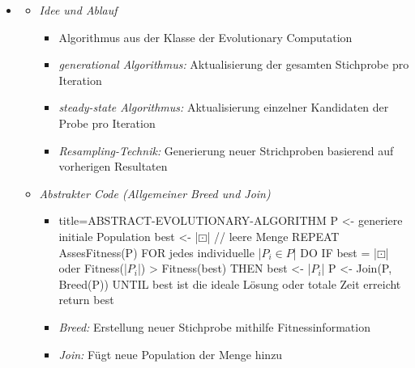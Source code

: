 \documentclass[
    12pt,
    a4paper,
    ngerman,
    color=3b,%
    marginpar=false,
    colorback=false,
    leqno,
]{tudaexercise}
\begin{document}
\begin{itemize}
        \item {}
            \begin{itemize}
                \item \textit{Idee und Ablauf}
                    \begin{itemize}
                        \item Algorithmus aus der Klasse der Evolutionary Computation
                        \item \textit{generational Algorithmus:} Aktualisierung der gesamten Stichprobe pro Iteration
                        \item \textit{steady-state Algorithmus:} Aktualisierung einzelner Kandidaten der Probe pro Iteration
                        \item \textit{Resampling-Technik:} Generierung neuer Strichproben basierend auf vorherigen Resultaten
                    \end{itemize}

                \item \textit{Abstrakter Code (Allgemeiner Breed und Join)}
                    \begin{itemize}
                        \item[] 
                            \begin{ccode}[autogobble,escapeinside=||]{title={ABSTRACT-EVOLUTIONARY-ALGORITHM}}
                            P <- generiere initiale Population
                            best <- |$\boxdot$| // leere Menge
                            REPEAT
                                AssesFitness(P)
                                FOR jedes individuelle |$P_i \in P$| DO
                                    IF best = |$\boxdot$| oder Fitness(|$P_i$|) > Fitness(best) THEN
                                        best <- |$P_i$|
                                P <- Join(P, Breed(P))
                            UNTIL best ist die ideale Lösung oder totale Zeit erreicht
                            return best
                            \end{ccode}
                        \item \textit{Breed:} Erstellung neuer Stichprobe mithilfe Fitnessinformation
                        \item \textit{Join:} Fügt neue Population der Menge hinzu
                    \end{itemize}


\end{itemize}
\end{itemize}
\end{document}
